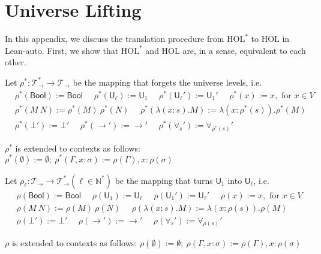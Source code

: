 \section{Universe Lifting}\label{appulift}

  In this appendix, we discuss the translation procedure from $\text{HOL}^*$ to HOL
  in Lean-auto. First, we show that $\text{HOL}^*$ and HOL are, in a sense, equivalent to each other.

  \begin{definition}
    Let $\rho^* : \mathcal{T}_\to^* \to \mathcal{T}_\to$ be the mapping that forgets the universe levels, i.e.
    $$\begin{aligned}
    & \rho^*(\mathsf{Bool}) := \mathsf{Bool} \ \ \ \ \ \ \rho^*(\mathsf{U}_\ell) := \mathsf{U}_1 \ \ \ \ \ \
      \rho^*(\mathsf{U}_\ell') := \mathsf{U}_1' \ \ \ \ \ \ \rho^*(x) := x, \text{ for }x \in V \\
    & \rho^*(M \ N) := \rho^*(M) \ \rho^*(N) \ \ \ \ \ \ \rho^*(\lambda (x : s). M) := \lambda (x : \rho^*(s)). \rho^*(M) \\
    & \rho^*(\bot') := \bot' \ \ \ \ \ \ \rho^*(\to') := \to' \ \ \ \ \ \ \rho^*(\forall_s') := \forall_{\rho^*(s)}'
    \end{aligned}$$

    \noindent $\rho^*$ is extended to contexts as follows: $\rho^*(\emptyset) := \emptyset; \ \rho^*(\Gamma, x : \sigma) := \rho(\Gamma), x : \rho(\sigma)$
  \end{definition}

  \begin{definition}
    Let $\rho_\ell : \mathcal{T}_\to \to \mathcal{T}_\to^*(\ell \in \mathbb{N}^*)$ be the mapping that turns $\mathsf{U}_1$ into $\mathsf{U}_\ell$, i.e.
    $$\begin{aligned}
    & \rho(\mathsf{Bool}) := \mathsf{Bool} \ \ \ \ \ \ \rho(\mathsf{U}_1) := \mathsf{U}_\ell \ \ \ \ \ \
      \rho(\mathsf{U}_1') := \mathsf{U}_\ell' \ \ \ \ \ \ \rho(x) := x, \text{ for }x \in V \\
    & \rho(M \ N) := \rho(M) \ \rho(N) \ \ \ \ \ \ \rho(\lambda (x : s). M) := \lambda (x : \rho(s)). \rho(M) \\
    & \rho(\bot') := \bot' \ \ \ \ \ \ \rho(\to') := \to' \ \ \ \ \ \ \rho(\forall_s') := \forall_{\rho(s)}'
    \end{aligned}$$

    \noindent $\rho$ is extended to contexts as follows: $\rho(\emptyset) := \emptyset; \ \rho(\Gamma, x : \sigma) := \rho(\Gamma), x : \rho(\sigma)$
  \end{definition}

